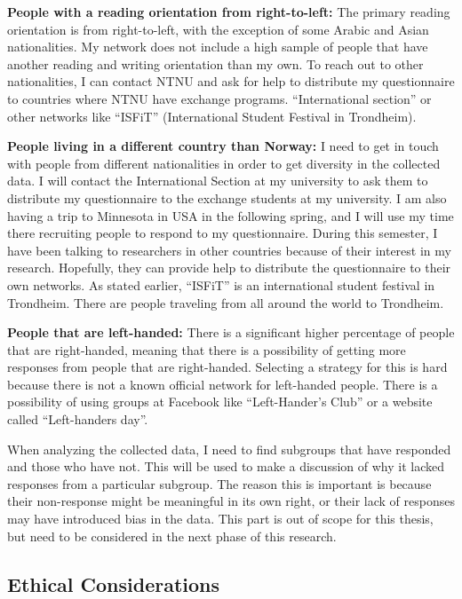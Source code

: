     {\bf People with a reading orientation from right-to-left:} The primary reading orientation is from right-to-left, with the exception of some Arabic and Asian nationalities. My network does not include a high sample of people that have another reading and writing orientation than my own. To reach out to other nationalities, I can contact NTNU and ask for help to distribute my questionnaire to countries where NTNU have exchange programs. ``International section'' or other networks like ``ISFiT'' (International Student Festival in Trondheim).

    {\bf People living in a different country than Norway:} I need to get in touch with people from different nationalities in order to get diversity in the collected data. I will contact the International Section at my university to ask them to distribute my questionnaire to the exchange students at my university. I am also having a trip to Minnesota in USA in the following spring, and I will use my time there recruiting people to respond to my questionnaire. During this semester, I have been talking to researchers in other countries because of their interest in my research. Hopefully, they can provide help to distribute the questionnaire to their own networks. As stated earlier, ``ISFiT'' is an international student festival in Trondheim. There are people traveling from all around the world to Trondheim.

    {\bf People that are left-handed:} There is a significant higher percentage of people that are right-handed, meaning that there is a possibility of getting more responses from people that are right-handed. Selecting a strategy for this is hard because there is not a known official network for left-handed people. There is a possibility of using groups at Facebook like ``Left-Hander's Club'' or a website called ``Left-handers day''.

    When analyzing the collected data, I need to find subgroups that have responded and those who have not. This will be used to make a discussion of why it lacked responses from a particular subgroup. The reason this is important is because their non-response might be meaningful in its own right, or their lack of responses may have introduced bias in the data. This part is out of scope for this thesis, but need to be considered in the next phase of this research.

  \subsection{Ethical Considerations}
    